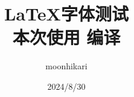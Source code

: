\documentclass{article}
\begin{document}
\title{ \Huge \LaTeX 字体测试\\ \vspace*{0.5em}
\large 本次使用
\ifLuaTeX
\LuaLaTeX 
\fi
\ifXeTeX
\XeLaTeX 
\fi
编译}
\author{moonhikari}
\date{2024/8/30}
\maketitle

\tableofcontents \newpage

\newpage
\end{document}
